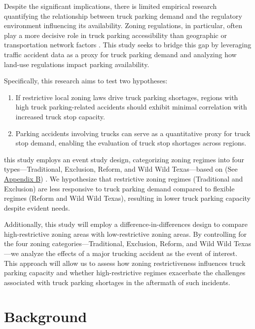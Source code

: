 \documentclass[
  12pt]{article}
\begin{document}
Despite the significant implications, there is limited empirical
research quantifying the relationship between truck parking demand and
the regulatory environment influencing its availability. Zoning
regulations, in particular, often play a more decisive role in truck
parking accessibility than geographic or transportation network factors
\citep{shertzerZoningEconomicGeography2018}. This study seeks to bridge
this gap by leveraging traffic accident data as a proxy for truck
parking demand and analyzing how land-use regulations impact parking
availability.

Specifically, this research aims to test two hypotheses:

\begin{enumerate}
\def\labelenumi{\arabic{enumi}.}
\item
  If restrictive local zoning laws drive truck parking shortages,
  regions with high truck parking-related accidents should exhibit
  minimal correlation with increased truck stop capacity.
\item
  Parking accidents involving trucks can serve as a quantitative proxy
  for truck stop demand, enabling the evaluation of truck stop shortages
  across regions.
\end{enumerate}

this study employs an event study design, categorizing zoning regimes
into four types---Traditional, Exclusion, Reform, and Wild Wild
Texas---based on \citep{puentesTraditionalReformedReview2006} (See
\label{sec:appendix-b}\hyperref[sec-b.-map-of-zoning-categories]{Appendi}\hyperref[sec:appendix-b]{x
B}) . We hypothesize that restrictive zoning regimes (Traditional and
Exclusion) are less responsive to truck parking demand compared to
flexible regimes (Reform and Wild Wild Texas), resulting in lower truck
parking capacity despite evident needs.

Additionally, this study will employ a difference-in-differences design
to compare high-restrictive zoning areas with low-restrictive zoning
areas. By controlling for the four zoning categories---Traditional,
Exclusion, Reform, and Wild Wild Texas---we analyze the effects of a
major trucking accident as the event of interest. This approach will
allow us to assess how zoning restrictiveness influences truck parking
capacity and whether high-restrictive regimes exacerbate the challenges
associated with truck parking shortages in the aftermath of such
incidents.

\section{Background}\label{background}
\end{document}
